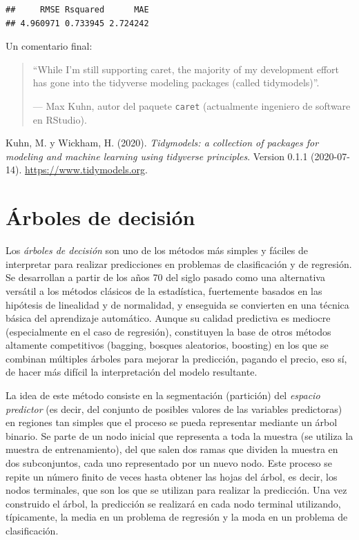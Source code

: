 \documentclass[]{book}
\theoremstyle{break}
\theoremstyle{definition}
\theoremstyle{definition}
\theoremstyle{definition}
\theoremstyle{remark}
\begin{document}
\begin{verbatim}
##     RMSE Rsquared      MAE 
## 4.960971 0.733945 2.724242
\end{verbatim}

Un comentario final:

\begin{quote}
``While I'm still supporting caret, the majority of my development
effort has gone into the tidyverse modeling packages (called
tidymodels)''.

--- Max Kuhn, autor del paquete \texttt{caret} (actualmente ingeniero de
software en RStudio).
\end{quote}

Kuhn, M. y Wickham, H. (2020). \emph{Tidymodels: a collection of
packages for modeling and machine learning using tidyverse principles}.
Version 0.1.1 (2020-07-14). \url{https://www.tidymodels.org}.

\chapter{Árboles de decisión}\label{trees}

Los \emph{árboles de decisión} son uno de los métodos más simples y
fáciles de interpretar para realizar predicciones en problemas de
clasificación y de regresión. Se desarrollan a partir de los años 70 del
siglo pasado como una alternativa versátil a los métodos clásicos de la
estadística, fuertemente basados en las hipótesis de linealidad y de
normalidad, y enseguida se convierten en una técnica básica del
aprendizaje automático. Aunque su calidad predictiva es mediocre
(especialmente en el caso de regresión), constituyen la base de otros
métodos altamente competitivos (bagging, bosques aleatorios, boosting)
en los que se combinan múltiples árboles para mejorar la predicción,
pagando el precio, eso sí, de hacer más difícil la interpretación del
modelo resultante.

La idea de este método consiste en la segmentación (partición) del
\emph{espacio predictor} (es decir, del conjunto de posibles valores de
las variables predictoras) en regiones tan simples que el proceso se
pueda representar mediante un árbol binario. Se parte de un nodo inicial
que representa a toda la muestra (se utiliza la muestra de
entrenamiento), del que salen dos ramas que dividen la muestra en dos
subconjuntos, cada uno representado por un nuevo nodo. Este proceso se
repite un número finito de veces hasta obtener las hojas del árbol, es
decir, los nodos terminales, que son los que se utilizan para realizar
la predicción. Una vez construido el árbol, la predicción se realizará
en cada nodo terminal utilizando, típicamente, la media en un problema
de regresión y la moda en un problema de clasificación.
\end{document}
